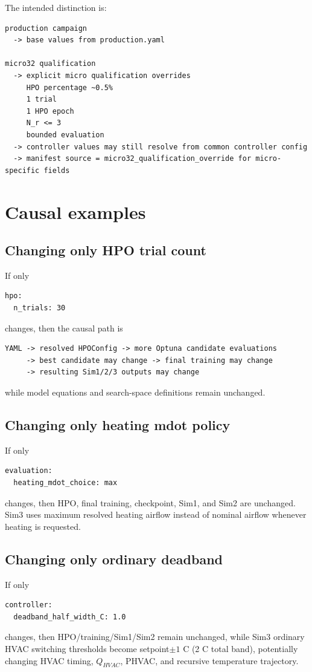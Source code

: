 \documentclass[10pt]{article}
\begin{document}
The intended distinction is:
\begin{verbatim}
production campaign
  -> base values from production.yaml

micro32 qualification
  -> explicit micro qualification overrides
     HPO percentage ~0.5%
     1 trial
     1 HPO epoch
     N_r <= 3
     bounded evaluation
  -> controller values may still resolve from common controller config
  -> manifest source = micro32_qualification_override for micro-specific fields
\end{verbatim}

\section{Causal examples}
\subsection{Changing only HPO trial count}
If only
\begin{Verbatim}[fontsize=\small]
hpo:
  n_trials: 30
\end{Verbatim}
changes, then the causal path is
\begin{verbatim}
YAML -> resolved HPOConfig -> more Optuna candidate evaluations
     -> best candidate may change -> final training may change
     -> resulting Sim1/2/3 outputs may change
\end{verbatim}
while model equations and search-space definitions remain unchanged.

\subsection{Changing only heating mdot policy}
If only
\begin{Verbatim}[fontsize=\small]
evaluation:
  heating_mdot_choice: max
\end{Verbatim}
changes, then HPO, final training, checkpoint, Sim1, and Sim2 are unchanged. Sim3 uses maximum resolved heating airflow instead of nominal airflow whenever heating is requested.

\subsection{Changing only ordinary deadband}
If only
\begin{Verbatim}[fontsize=\small]
controller:
  deadband_half_width_C: 1.0
\end{Verbatim}
changes, then HPO/training/Sim1/Sim2 remain unchanged, while Sim3 ordinary HVAC switching thresholds become setpoint$\pm1$ C (2 C total band), potentially changing HVAC timing, $Q_{HVAC}$, PHVAC, and recursive temperature trajectory.
\end{document}
